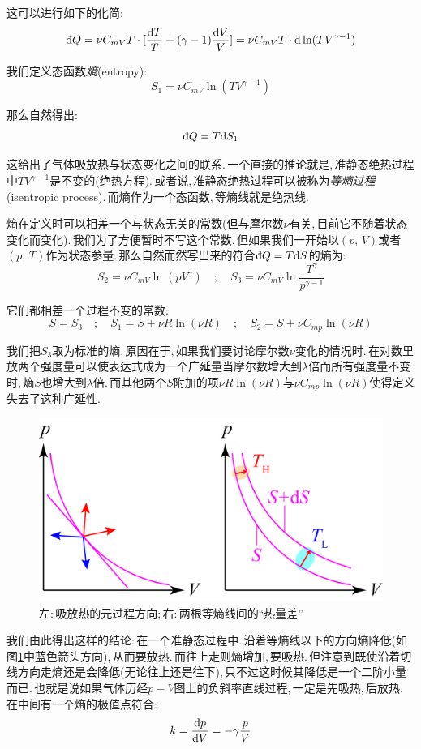 这可以进行如下的化简:
\[\dbar Q=\nu C_{mV} T\cdot [\frac{\ud T}{T}+(\gamma-1)\frac{\ud V}{V}]=\nu C_{mV} T\cdot\ud \ln(TV^{\gamma-1})\]

我们定义态函数\ca \emph{熵}(entropy):
\[S_1=\nu C_{mV}\ln(TV^{\gamma-1})\]

那么自然得出:
\[\dbar Q=T\ud S_1\]

这给出了气体吸放热与状态变化之间的联系.\,一个直接的推论就是,\,准静态绝热过程中$TV^{\gamma-1}$是不变的(绝热方程).\,或者说,\,准静态绝热过程可以被称为\emph{等熵过程}(isentropic process).\,而熵作为一个态函数,\,等熵线就是绝热线.

熵在定义时可以相差一个与状态无关的常数(但与摩尔数$\nu$有关,\,目前它不随着状态变化而变化).\,我们为了方便暂时不写这个常数.\,但如果我们一开始以$(p,\,V)$或者$(p,\,T)$作为状态参量.\,那么自然而然写出来的符合$\dbar Q=T\ud S$的熵为:
\[S_2=\nu C_{mV}\ln(pV^\gamma)\quad ;\quad S_3=\nu C_{mV}\ln\frac{T^\gamma}{p^{\gamma-1}}\]

它们都相差一个过程不变的常数:
\[S=S_3\quad ;\quad S_1=S+\nu R\ln(\nu R)\quad ;\quad S_2=S+\nu C_{mp}\ln(\nu R)\]

我们把$S_3$取为标准的熵.\,原因在于,\,如果我们要讨论摩尔数$\nu$变化的情况时.\,在对数里放两个强度量可以使表达式成为一个广延量\ca 当摩尔数增大到$\lambda$倍而所有强度量不变时,\,熵$S$也增大到$\lambda$倍.\,而其他两个$S$附加的项$\nu R\ln(\nu R)$与$\nu C_{mp}\ln(\nu R)$使得定义失去了这种广延性.

\begin{figure}[H]
\centering
\includegraphics[width=15cm]{image/5-2-11.png}
\caption{左:\,吸放热的元过程方向;\,右:\,两根等熵线间的``热量差''}\label{fig5-2-11}
\end{figure}

我们由此得出这样的结论:\,在一个准静态过程中.\,沿着等熵线以下的方向熵降低(如图\ref{fig5-2-11}中蓝色箭头方向),\,从而要放热.\,而往上走则熵增加,\,要吸热.\,但注意到既使沿着切线方向走熵还是会降低(无论往上还是往下),\,只不过这时候其降低是一个二阶小量而已.\,也就是说如果气体历经$p-V$图上的负斜率直线过程,\,一定是先吸热,\,后放热.\,在中间有一个熵的极值点符合:
\[k=\frac{\textrm{d} p}{\textrm{d} V}=-\gamma\frac{p}{V}\]

